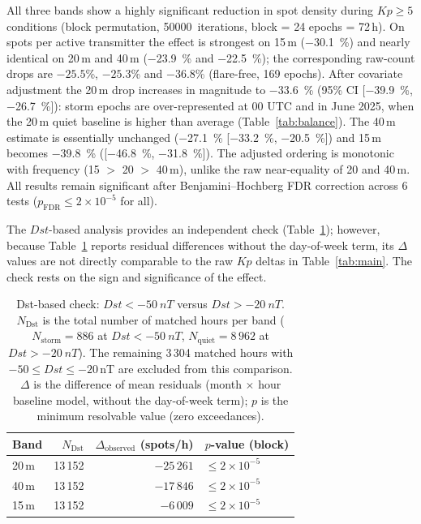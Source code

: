 \documentclass{agujournal2019}
\begin{document}
All three bands show a highly significant reduction in spot density during
$Kp \ge 5$ conditions (block permutation, \SI{50000}{iterations},
block = 24 epochs = 72\,h). On spots per active transmitter the
effect is strongest on 15\,m (\SI{-30.1}{\percent}) and nearly
identical on 20\,m and 40\,m (\SI{-23.9}{\percent} and
\SI{-22.5}{\percent}); the corresponding raw-count drops are
$-25.5$\%, $-25.3$\% and $-36.8$\% (flare-free, 169 epochs). After covariate
adjustment the 20\,m drop increases in magnitude to \SI{-33.6}{\percent}
(95\% CI [\SI{-39.9}{\percent}, \SI{-26.7}{\percent}]): storm epochs are
over-represented at 00 UTC and in June 2025, when the 20\,m quiet baseline is
higher than average (Table~\ref{tab:balance}). The 40\,m estimate is
essentially unchanged (\SI{-27.1}{\percent}
[\SI{-33.2}{\percent}, \SI{-20.5}{\percent}]) and 15\,m becomes
\SI{-39.8}{\percent} ([\SI{-46.8}{\percent}, \SI{-31.8}{\percent}]). The
adjusted ordering is monotonic with frequency (15 $>$ 20 $>$ 40\,m), unlike
the raw near-equality of 20 and 40\,m. All results remain significant after
Benjamini--Hochberg FDR correction across 6 tests
($p_{\text{FDR}} \le 2 \times 10^{-5}$ for all).

The $Dst$-based analysis provides an independent check
(Table~\ref{tab:dst}); however, because Table~\ref{tab:dst} reports
residual differences without the day-of-week term, its $\Delta$ values are
not directly comparable to the raw $Kp$ deltas in Table~\ref{tab:main}. The
check rests on the sign and significance of the effect.

\begin{table}[h]
	\centering
	\caption{Dst-based check: $Dst < \SI{-50}{nT}$ versus
		$Dst > \SI{-20}{nT}$. $N_{\text{Dst}}$ is the total number of
		matched hours per band ($N_{\text{storm}} = 886$ at
		$Dst < \SI{-50}{nT}$, $N_{\text{quiet}} = 8\,962$ at
		$Dst > \SI{-20}{nT}$). The remaining 3\,304 matched hours with
		$-50 \le Dst \le -20$\,nT are excluded from this comparison.
		$\Delta$ is the difference of mean residuals (month $\times$ hour
		baseline model, without the day-of-week term); $p$ is the minimum
		resolvable value (zero exceedances).}
	\label{tab:dst}
	\begin{tabular}{lrrl}
		\toprule
		Band  & $N_{\text{Dst}}$  & $\Delta_{\text{observed}}$ (spots/h)
		      & $p$-value (block)                                                    \\
		\midrule
		20\,m & 13\,152           & $-25\,261$                           & $\le 2 \times 10^{-5}$ \\
		40\,m & 13\,152           & $-17\,846$                           & $\le 2 \times 10^{-5}$ \\
		15\,m & 13\,152           & $-6\,009$                            & $\le 2 \times 10^{-5}$ \\
		\bottomrule
	\end{tabular}
\end{table}
\end{document}
